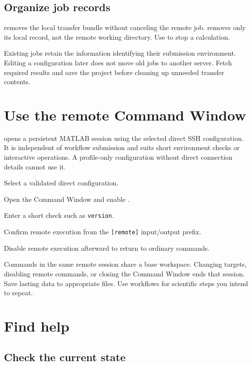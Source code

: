 \subsection{Organize job records}

 removes the local transfer bundle without canceling the remote job.  removes only its local record, not the remote working directory. Use  to stop a calculation.

Existing jobs retain the information identifying their submission environment. Editing a configuration later does not move old jobs to another server. Fetch required results and save the project before cleaning up unneeded transfer contents.

\section{Use the remote Command Window}

 opens a persistent MATLAB\regmark{} session using the selected direct SSH configuration. It is independent of workflow submission and suits short environment checks or interactive operations. A profile-only configuration without direct connection details cannot use it.

\begin{steps}
\item Select a validated direct configuration.
\item Open the Command Window and enable .
\item Enter a short check such as \texttt{version}.
\item Confirm remote execution from the \texttt{[remote]} input/output prefix.
\item Disable remote execution afterward to return to ordinary commands.
\end{steps}

Commands in the same remote session share a base workspace. Changing targets, disabling remote commands, or closing the Command Window ends that session. Save lasting data to appropriate files. Use workflows for scientific steps you intend to repeat.

\section{Find help}

\subsection{Check the current state}

